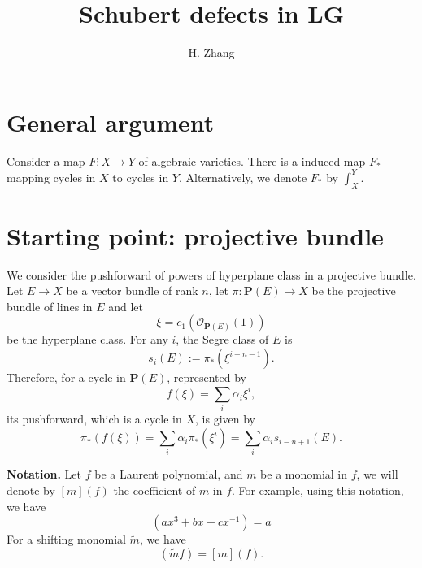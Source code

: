 \documentclass[a4paper,11pt]{article}
\title{\boldmath Schubert defects in LG}
\author{H. Zhang}
\affiliation{Virginia Tech}
\begin{document}
\maketitle
\flushbottom

\section{General argument}
Consider a map $F: X \to Y$ of algebraic varieties. There is a induced map $F_*$ mapping cycles in $X$ to cycles in $Y$. Alternatively, we denote $F_*$ by $\int_X^Y$.

\section{Starting point: projective bundle}
We consider the pushforward of powers of hyperplane class in a projective bundle. Let $E \to X$ be a vector bundle of rank $n$, let $\pi: \mathbf{P}(E) \to X$ be the projective bundle of lines in $E$ and let
\begin{equation}
    \xi = c_1 \left(\mathcal{O}_{\mathbf{P}(E)}(1)\right)
\end{equation}
be the hyperplane class. For any $i$, the Segre class of $E$ is
\begin{equation}
    s_i(E) :=\pi_*(\xi^{i+n-1}).
\end{equation}
Therefore, for a cycle in $\mathbf{P}(E)$, represented by
\begin{equation}
    f(\xi) = \sum_i \alpha_i \xi^i,
\end{equation}
its pushforward, which is a cycle in $X$, is given by
\begin{equation}
    \pi_*(f(\xi)) = \sum_i \alpha_i \pi_* (\xi^i) = \sum_i \alpha_i s_{i-n+1}(E).
\end{equation}

\bigskip
\noindent\textbf{Notation.} Let $f$ be a Laurent polynomial, and $m$ be a monomial in $f$, we will denote by $[m](f)$ the coefficient of $m$ in $f$. For example, using this notation, we have
\begin{equation}
    [x^3](ax^3 + bx + cx^{-1}) = a
\end{equation}
For a shifting monomial $\tilde{m}$, we have
\begin{equation}
    [\tilde{m}m](\tilde{m}f) = [m](f).
\end{equation}
\end{document}
